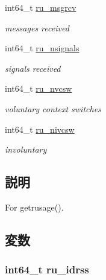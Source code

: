 \begin{DoxyCompactItemize}
int64\_\-t \hyperlink{structOperatingSystem_1_1rusage_a76a1a216776ce4c8e99d59e12b94469d}{ru\_\-msgrcv}
\begin{DoxyCompactList}\small\item\em messages received \item\end{DoxyCompactList}\item 
int64\_\-t \hyperlink{structOperatingSystem_1_1rusage_afafc5b85af3aa14ff03dc9051cd99803}{ru\_\-nsignals}
\begin{DoxyCompactList}\small\item\em signals received \item\end{DoxyCompactList}\item 
int64\_\-t \hyperlink{structOperatingSystem_1_1rusage_a488b8289bbd360fe61edb0bc26ccdb4d}{ru\_\-nvcsw}
\begin{DoxyCompactList}\small\item\em voluntary context switches \item\end{DoxyCompactList}\item 
int64\_\-t \hyperlink{structOperatingSystem_1_1rusage_ad6c040bd0a4bea27aac25d2b46398f13}{ru\_\-nivcsw}
\begin{DoxyCompactList}\small\item\em involuntary  \item\end{DoxyCompactList}\end{DoxyCompactItemize}


\subsection{説明}
For getrusage(). 

\subsection{変数}
\hypertarget{structOperatingSystem_1_1rusage_a957d4290597d297f4fe76a7136182b75}{
\subsubsection[{ru\_\-idrss}]{\setlength{\rightskip}{0pt plus 5cm}int64\_\-t {\bf ru\_\-idrss}}}
\label{structOperatingSystem_1_1rusage_a957d4290597d297f4fe76a7136182b75}


